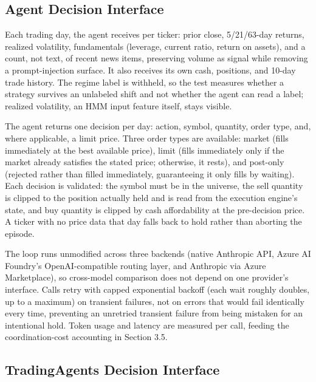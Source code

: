 \documentclass{article}
\begin{document}
\subsection{Agent Decision Interface}

Each trading day, the agent receives per ticker: prior close, 5/21/63-day returns, realized volatility, fundamentals (leverage, current ratio, return on assets), and a count, not text, of recent news items, preserving volume as signal while removing a prompt-injection surface. It also receives its own cash, positions, and 10-day trade history. The regime label is withheld, so the test measures whether a strategy survives an unlabeled shift and not whether the agent can read a label; realized volatility, an HMM input feature itself, stays visible.

The agent returns one decision per day: action, symbol, quantity, order type, and, where applicable, a limit price. Three order types are available: market (fills immediately at the best available price), limit (fills immediately only if the market already satisfies the stated price; otherwise, it rests), and post-only (rejected rather than filled immediately, guaranteeing it only fills by waiting). Each decision is validated: the symbol must be in the universe, the sell quantity is clipped to the position actually held and is read from the execution engine's state, and buy quantity is clipped by cash affordability at the pre-decision price. A ticker with no price data that day falls back to hold rather than aborting the episode.

The loop runs unmodified across three backends (native Anthropic API, Azure AI Foundry's OpenAI-compatible routing layer, and Anthropic via Azure Marketplace), so cross-model comparison does not depend on one provider's interface. Calls retry with capped exponential backoff (each wait roughly doubles, up to a maximum) on transient failures, not on errors that would fail identically every time, preventing an unretried transient failure from being mistaken for an intentional hold. Token usage and latency are measured per call, feeding the coordination-cost accounting in Section 3.5.

\subsection{TradingAgents Decision Interface}
\end{document}
